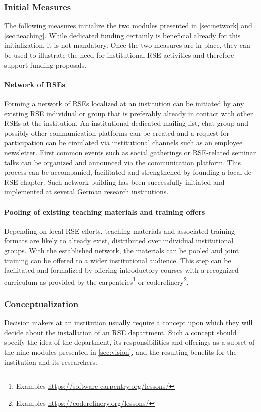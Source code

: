 \documentclass[a4paper]{article}
\begin{document}
\subsubsection{Initial Measures}
The following measures initialize the two modules presented in \autoref{sec:network} and \autoref{sec:teaching}.
While dedicated funding certainly is beneficial already for this initialization, it is not mandatory.
Once the two measures are in place, they can be used to illustrate the need for institutional RSE activities and therefore support funding proposals.

\paragraph{Network of RSEs}
Forming a network of RSEs localized at an institution can be initiated by any existing RSE individual or group that is preferably already in contact with other RSEs at the institution.
An institutional dedicated mailing list, chat group and possibly other communication platforms can be created and a request for participation can be circulated via institutional channels such as an employee newsletter.
First common events such as social gatherings or RSE-related seminar talks can be organized and announced via the communication platform.
This process can be accompanied, facilitated and strengthened by founding a local de-RSE chapter.
Such network-building has been successfully initiated and implemented at several German research institutions.

\paragraph{Pooling of existing teaching materials and training offers}
Depending on local RSE efforts, teaching materials and associated training formats are likely to already exist,
distributed over individual institutional groups.
With the established network, the materials can be pooled and joint training can be offered to a wider institutional audience.
This step can be facilitated and formalized by offering introductory courses with a recognized curriculum as provided by the carpentries\footnote{Examples \url{https://software-carpentry.org/lessons/}}
or coderefinery\footnote{Examples \url{https://coderefinery.org/lessons/}}.

\subsubsection{Conceptualization}
Decision makers at an institution usually require a concept upon which they will decide about the installation of an RSE department.
Such a concept should specify the idea of the department, its responsibilities and offerings as a subset of the nine modules presented in \autoref{sec:vision}, and the resulting benefits for the institution and its researchers.
\end{document}

